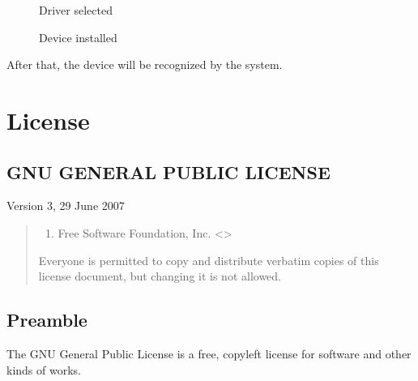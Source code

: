 \documentclass[letterpaper,10pt,english]{sphinxmanual}
\begin{document}
\begin{figure}[htbp]
\centering
\capstart

\noindent{}
\caption{Driver selected}\label{\detokenize{error:id3}}\label{\detokenize{error:figure-install-driver}}\end{figure}

\begin{figure}[htbp]
\centering
\capstart

\noindent{}
\caption{Device installed}\label{\detokenize{error:id4}}\label{\detokenize{error:figure-device-success}}\end{figure}

\sphinxAtStartPar
After that, the device will be recognized by the system.

\sphinxstepscope


\chapter{License}
\label{\detokenize{license:license}}\label{\detokenize{license::doc}}

\section{GNU GENERAL PUBLIC LICENSE}
\label{\detokenize{license:gnu-general-public-license}}
\sphinxAtStartPar
Version 3, 29 June 2007
\begin{quote}\begin{description}
\begin{enumerate}
%
\setcounter{enumi}{2}
\item {} 
 Free Software Foundation, Inc. \textless{}\textgreater{}

\end{enumerate}

\sphinxAtStartPar
Everyone is permitted to copy and distribute verbatim copies of this license document, but changing it is not allowed.

\end{description}\end{quote}


\section{Preamble}
\label{\detokenize{license:preamble}}
\sphinxAtStartPar
The GNU General Public License is a free, copyleft license for software and other kinds of works.
\end{document}

